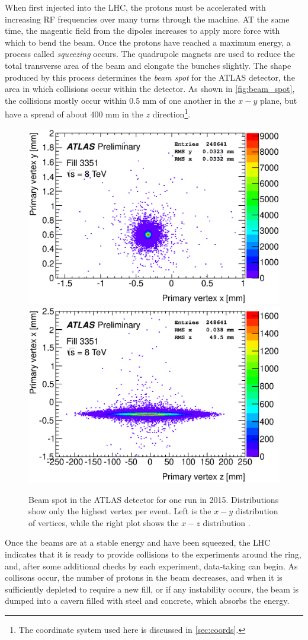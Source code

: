 When first injected into the \ac{LHC}, the protons must be accelerated with increasing \ac{RF} frequencies over many turns through the machine. AT the same time, the magentic field from the dipoles increases to apply more force with which to bend the beam. Once the protons have reached a maximum energy, a process called \textit{squeezing} occurs. The quadrupole magnets are used to reduce the total transverse area of the beam and elongate the bunches slightly. The shape produced by this process determines the \textit{beam spot} for the \ac{ATLAS} detector, the area in which collisions occur within the detector. As shown in \autoref{fig:beam_spot}, the collisions mostly occur within 0.5 mm of one another in the $x-y$ plane, but have a spread of about 400 mm in the $z$ direction\footnote{The coordinate system used here is discussed in \autoref{sec:coords}.}.

\begin{centering}
\begin{figure}[!hbt]
\myfloatalign
\includegraphics[width=.45\linewidth]{figures/lhc/beamspot-run215456-vtx-yx.eps}
\includegraphics[width=.45\linewidth]{figures/lhc/beamspot-run215456-vtx-xz.eps}
\caption{Beam spot in the \ac{ATLAS} detector for one run in 2015. Distributions show only the highest \pt vertex per event. Left is the $x-y$ distribution of vertices, while the right plot shows the $x-z$ distribution \cite{beamspot}.}
\label{fig:beam_spot}
\end{figure}
\end{centering}

Once the beams are at a stable energy and have been squeezed, the \ac{LHC} indicates that it is ready to provide collisions to the experiments around the ring, and, after some additional checks by each experiment, data-taking can begin. As collisons occur, the number of protons in the beam decreases, and when it is sufficiently depleted to require a new fill, or if any instability occurs, the beam is dumped into a cavern filled with steel and concrete, which absorbs the energy. 

